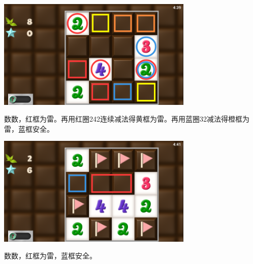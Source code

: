 \subsection{} %
\begin{center}
    \includegraphics[width=0.7\textwidth]{puzzle/53-1.png}
\end{center}
数数，红框为雷。再用红圈242连续减法得黄框为雷。再用蓝圈32减法得橙框为雷，蓝框安全。
\begin{center}
    \includegraphics[width=0.7\textwidth]{puzzle/53-2.png}
\end{center}
数数，红框为雷，蓝框安全。

